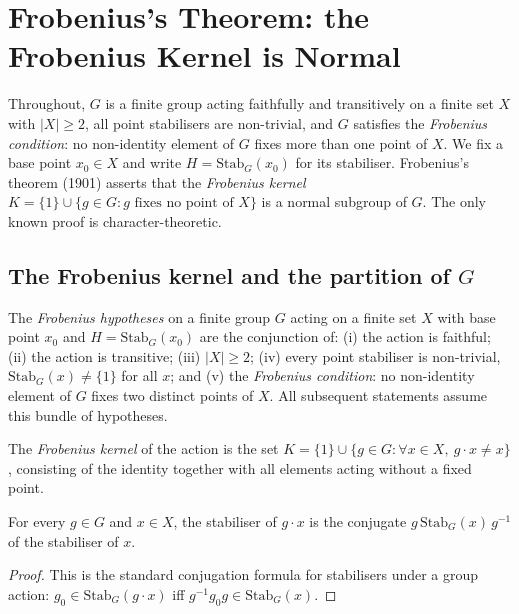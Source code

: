 \section{Frobenius's Theorem: the Frobenius Kernel is Normal}

Throughout, $G$ is a finite group acting faithfully and transitively on a finite
set $X$ with $|X| \ge 2$, all point stabilisers are non-trivial, and $G$
satisfies the \emph{Frobenius condition}: no non-identity element of $G$ fixes
more than one point of $X$. We fix a base point $x_0 \in X$ and write
$H = \mathrm{Stab}_G(x_0)$ for its stabiliser. Frobenius's theorem (1901) asserts
that the \emph{Frobenius kernel}
$K = \{1\} \cup \{ g \in G : g \text{ fixes no point of } X \}$
is a normal subgroup of $G$. The only known proof is character-theoretic.

\subsection{The Frobenius kernel and the partition of $G$}

\begin{definition}
    \label{def:frobenius-hypotheses}
    \leanok
    The \emph{Frobenius hypotheses} on a finite group $G$ acting on a finite set
    $X$ with base point $x_0$ and $H = \mathrm{Stab}_G(x_0)$ are the conjunction
    of: (i) the action is faithful; (ii) the action is transitive; (iii)
    $|X| \ge 2$; (iv) every point stabiliser is non-trivial,
    $\mathrm{Stab}_G(x) \neq \{1\}$ for all $x$; and (v) the \emph{Frobenius
    condition}: no non-identity element of $G$ fixes two distinct points of $X$.
    All subsequent statements assume this bundle of hypotheses.
\end{definition}

\begin{definition}
    \label{def:frobenius-kernel}
    \leanok
    The \emph{Frobenius kernel} of the action is the set
    $K = \{1\} \cup \{ g \in G : \forall x \in X,\ g \cdot x \neq x \}$,
    consisting of the identity together with all elements acting without a fixed
    point.
\end{definition}

\begin{lemma}
    \label{lem:stabilizer-conj}
    For every $g \in G$ and $x \in X$, the stabiliser of $g \cdot x$ is the
    conjugate $g\, \mathrm{Stab}_G(x)\, g^{-1}$ of the stabiliser of $x$.
\end{lemma}
\begin{proof}
    This is the standard conjugation formula for stabilisers under a group
    action: $g_0 \in \mathrm{Stab}_G(g\cdot x)$ iff $g^{-1} g_0 g \in
    \mathrm{Stab}_G(x)$.
\end{proof}

